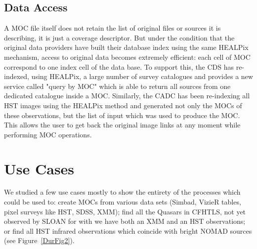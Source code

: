 \subsection{Data Access}
A MOC file itself does not retain the list of original files or sources it is describing, it is just a coverage descriptor. But under the condition that the original data providers have built their database index using the same HEALPix mechanism, access to original data becomes extremely efficient: each cell of MOC correspond to one index cell of the data base. To support this, the CDS has re-indexed, using HEALPix, a large number of survey catalogues and provides a new service called "query by MOC" which is able to return all sources from one dedicated catalogue inside a MOC. Similarly, the CADC has been re-indexing all HST images using the HEALPix method and generated not only the MOCs of these observations, but the list of input which was used to produce the MOC. This allows the user to get back the original image links at any moment while performing MOC operations.

\section{Use Cases}
We studied a few use cases mostly to show the entirety of the processes which could be used to: create MOCs from various data sets (Simbad, VizieR tables, pixel surveys like HST, SDSS, XMM); find all the Quasars in CFHTLS, not yet observed by SLOAN for with we have both an XMM and an HST observations; or find all HST infrared observations which coincide with bright NOMAD sources (see Figure~\ref{DurFig2}).


